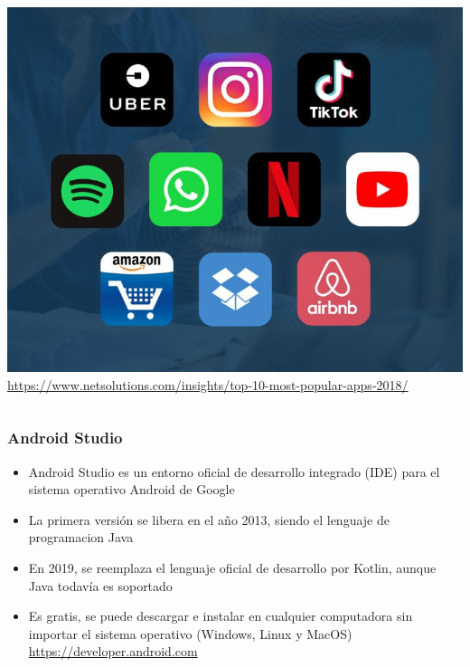 \begin{frame}
\begin{columns}
\begin{center}
\includegraphics[width=0.95\linewidth]{00_IntroProgramacionYMoviles/most-popular-apps.jpg} 
\tiny{\url{https://www.netsolutions.com/insights/top-10-most-popular-apps-2018/}}  
\end{center}
\end{columns}
\end{frame}


\begin{frame}
\frametitle{Android Studio}  

\begin{itemize}
\item Android Studio es un entorno oficial de desarrollo integrado (IDE) para el sistema operativo Android de Google
\item La primera versi\'on se libera en el año 2013, siendo el lenguaje de programacion Java
\item En 2019, se reemplaza el lenguaje oficial de desarrollo por Kotlin, aunque Java todav\'ia es soportado
\item Es gratis, se puede descargar e instalar en cualquier computadora sin importar el sistema operativo (Windows, Linux y MacOS)
\url{https://developer.android.com}
\end{itemize}
\end{frame}

